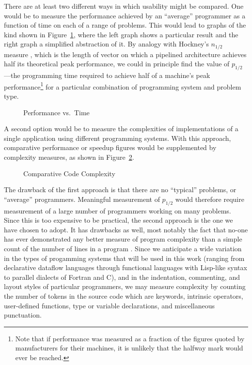 There are at least two different ways in which usability might be compared.
One would be to measure the performance achieved by an ``average'' programmer
as a function of time on each of a range of problems.
This would lead to graphs of the kind shown in Figure~\ref{f:perf},
where the left graph shows a particular result
and the right graph a simplified abstraction of it.
By analogy with Hockney's $n_{1/2}$ measure \cite{b:hockney-perfparam},
which is the length of vector on which a pipelined architecture achieves
half its theoretical peak performance,
we could in principle find the value of $p_{1/2}$---the programming time required to achieve
half of a machine's peak performance\footnote{Note that
	if performance was measured as a fraction of the figures quoted by manufacturers for their machines,
	it is unlikely that the halfway mark would ever be reached.}
for a particular combination of programming system and problem type.

\begin{figure}
\caption{Performance vs.\ Time\label{f:perf}}
\end{figure}

A second option would be to measure the complexities of
implementations of a single application using different programming systems.
With this approach,
comparative performance or speedup figures would be supplemented by complexity measures,
as shown in Figure~\ref{f:complex}.

\begin{figure}
\caption{Comparative Code Complexity\label{f:complex}}
\end{figure}

The drawback of the first approach is that there are no ``typical'' problems,
or ``average'' programmers.
Meaningful measurement of  $p_{1/2}$ would therefore require
measurement of a large number of programmers working on many problems.
Since this is too expensive to be practical,
the second approach is the one we have chosen to adopt.
It has drawbacks as well,
most notably the fact that no-one has ever demonstrated any better measure of program complexity
than a simple count of the number of lines in a program \cite{b:fenton-metrics}.
Since we anticipate a wide variation in the types of progamming systems that will be used in this work
(ranging from declarative dataflow languages
through functional languages with Lisp-like syntax
to parallel dialects of Fortran and C),
and in the indentation, commenting, and layout styles of particular programmers,
we may measure complexity by counting the number of tokens in the source code which are
keywords,
intrinsic operators,
user-defined functions,
type or variable declarations,
and miscellaneous punctuation.

